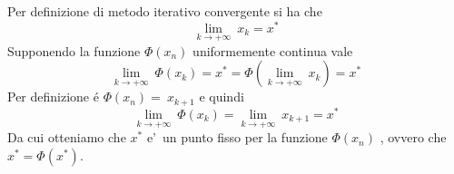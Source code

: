 Per definizione di metodo iterativo convergente si ha che 
\[
	\lim_{k \to +\infty}\ x_k = x^*
\]
Supponendo la funzione \( \Phi(x_n) \) uniformemente continua vale
\[
	\lim_{k \to +\infty}\ \Phi(x_k) = x^*  = \Phi ( \lim_{k \to +\infty}\ x_k ) = x^*
\]
Per definizione \'e \( \Phi(x_n) = \ x_{k+1} \) e quindi
\[
	\lim_{k \to +\infty}\ \Phi(x_k) = \lim_{k \to +\infty} \ x_{k+1} = x^*
\]
Da cui otteniamo che \( x^* \) e'\ un punto fisso per la funzione \( \Phi(x_n) \) , ovvero che \( x^* = \Phi(x^*) \).
